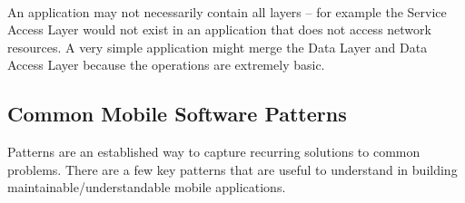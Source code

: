 \paragraph{}
An application may not necessarily contain all layers – for example the Service Access Layer would not exist in an application that does not access network resources. A very simple application might merge the Data Layer and Data Access Layer because the operations are extremely basic.



\subsection{Common Mobile Software Patterns}

Patterns are an established way to capture recurring solutions to common problems. There are a few key patterns that are useful to understand in building maintainable/understandable mobile applications.
